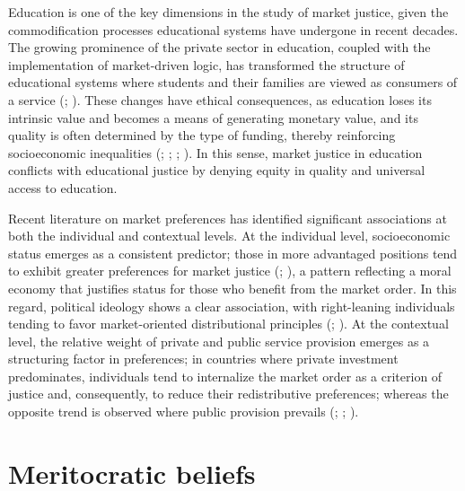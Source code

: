 \documentclass[
  spanish,
  a4paper,
  oneside]{scrbook}
\begin{document}
Education is one of the key dimensions in the study of market justice,
given the commodification processes educational systems have undergone
in recent decades. The growing prominence of the private sector in
education, coupled with the implementation of market-driven logic, has
transformed the structure of educational systems where students and
their families are viewed as consumers of a service
(; ). These changes
have ethical consequences, as education loses its intrinsic value and
becomes a means of generating monetary value, and its quality is often
determined by the type of funding, thereby reinforcing socioeconomic
inequalities (; ;
;
). In this sense, market justice
in education conflicts with educational justice by denying equity in
quality and universal access to education.

Recent literature on market preferences has identified significant
associations at both the individual and contextual levels. At the
individual level, socioeconomic status emerges as a consistent
predictor; those in more advantaged positions tend to exhibit greater
preferences for market justice (; ), a
pattern reflecting a moral economy that justifies status for those who
benefit from the market order. In this regard, political ideology shows
a clear association, with right-leaning individuals tending to favor
market-oriented distributional principles
(;
). At the
contextual level, the relative weight of private and public service
provision emerges as a structuring factor in preferences; in countries
where private investment predominates, individuals tend to internalize
the market order as a criterion of justice and, consequently, to reduce
their redistributive preferences; whereas the opposite trend is observed
where public provision prevails
(;
;
).

\section{Meritocratic beliefs}\label{meritocratic-beliefs}
\end{document}
